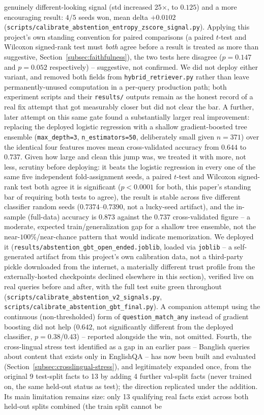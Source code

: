 \documentclass[a4paper,twoside]{article}
\begin{document}
genuinely different-looking signal (std increased 25$\times$, to $0.125$) and a more encouraging result: $4/5$ seeds won, mean delta $+0.0102$ (\texttt{scripts/calibrate\_abstention\_entropy\_zscore\_signal.py}). Applying this project's own standing convention for paired comparisons (a paired $t$-test and Wilcoxon signed-rank test must \emph{both} agree before a result is treated as more than suggestive, Section~\ref{subsec:faithfulness}), the two tests here disagree ($p=0.147$ and $p=0.052$ respectively) -- suggestive, not confirmed. We did not deploy either variant, and removed both fields from \texttt{hybrid\_retriever.py} rather than leave permanently-unused computation in a per-query production path; both experiment scripts and their \texttt{results/} outputs remain as the honest record of a real fix attempt that got measurably closer but did not clear the bar. A further, later attempt on this same gate found a substantially larger real improvement: replacing the deployed logistic regression with a shallow gradient-boosted tree ensemble (\texttt{max\_depth=3}, \texttt{n\_estimators=50}, deliberately small given $n=371$) over the identical four features moves mean cross-validated accuracy from $0.644$ to $0.737$. Given how large and clean this jump was, we treated it with more, not less, scrutiny before deploying: it beats the logistic regression in every one of the same five independent fold-assignment seeds, a paired $t$-test and Wilcoxon signed-rank test both agree it is significant ($p<0.0001$ for both, this paper's standing bar of requiring both tests to agree), the result is stable across five different classifier random seeds ($0.7374$--$0.7390$, not a lucky-seed artifact), and the in-sample (full-data) accuracy is $0.873$ against the $0.737$ cross-validated figure -- a moderate, expected train/generalization gap for a shallow tree ensemble, not the near-$100\%$/near-chance pattern that would indicate memorization. We deployed it (\texttt{results/abstention\_gbt\_open\_ended.joblib}, loaded via \texttt{joblib} -- a self-generated artifact from this project's own calibration data, not a third-party pickle downloaded from the internet, a materially different trust profile from the externally-hosted checkpoints declined elsewhere in this section), verified live on real queries before and after, with the full test suite green throughout (\texttt{scripts/calibrate\_abstention\_v2\_signals.py}, \texttt{scripts/calibrate\_abstention\_gbt\_final.py}). A companion attempt using the continuous (non-thresholded) form of \texttt{question\_match\_any} instead of gradient boosting did not help ($0.642$, not significantly different from the deployed classifier, $p=0.38$/$0.43$) -- reported alongside the win, not omitted. Fourth, the cross-lingual stress test identified as a gap in an earlier pass -- Banglish queries about content that exists only in EnglishQA -- has now been built and evaluated (Section~\ref{subsec:crosslingual-stress}), and legitimately expanded once, from the original 9 test-split facts to 13 by adding 4 further val-split facts (never trained on, the same held-out status as test); the direction replicated under the addition. Its main limitation remains size: only 13 qualifying real facts exist across both held-out splits combined (the train split cannot be 
\end{document}
